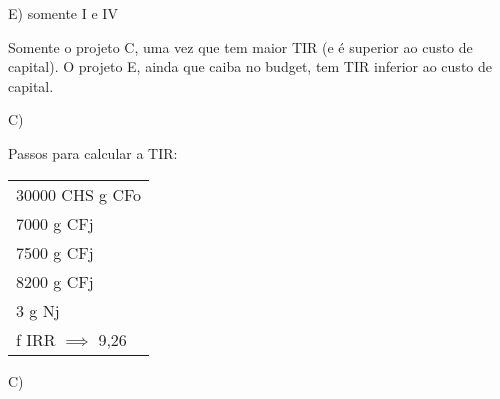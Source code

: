 \documentclass[a4paper]{report}
\begin{document}

E) somente I e IV


Somente o projeto C, uma vez que tem maior TIR (e é superior ao custo de capital). O projeto E, ainda que caiba no budget, tem TIR inferior ao custo de capital.


C)


Passos para calcular a TIR:
\begin{table}[H]
    \centering
    \begin{tabular}{l}
30000 CHS g CFo \\
7000 g CFj \\
7500 g CFj \\
8200 g CFj \\
3 g Nj \\
f IRR $\implies$ 9,26
    \end{tabular}
\end{table}

C)
\end{document}
